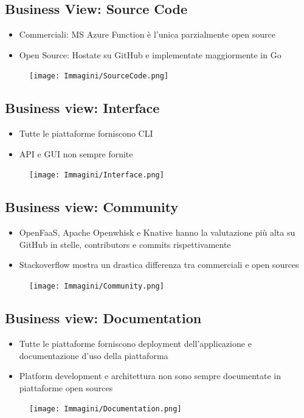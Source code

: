 \documentclass[a4paper, 12pt]{report}
\begin{document}
            \subsection{Business View: Source Code}
            \begin{itemize}
              \item Commerciali: MS Azure Function è l'unica parzialmente open source
              \item Open Source: Hostate su GitHub e implementate maggiormente in Go
            \end{itemize}
            \begin{figure}[h]
              \centering
              \texttt{[image: Immagini/SourceCode.png]}
            \end{figure}
            \subsection{Business view: Interface}
            \begin{itemize}
              \item Tutte le piattaforme forniscono CLI
              \item API e GUI non sempre fornite
            \end{itemize}
            \begin{figure}[h]
              \centering
              \texttt{[image: Immagini/Interface.png]}
            \end{figure}
            \clearpage
            \subsection{Business view: Community}
            \begin{itemize}
              \item OpenFaaS, Apache Openwhisk e Knative hanno la valutazione più alta su GitHub in stelle, contributors e commits rispettivamente
              \item Stackoverflow mostra un drastica differenza tra commerciali e open sources
            \end{itemize}
            \begin{figure}[h]
              \centering
              \texttt{[image: Immagini/Community.png]}
            \end{figure}
            \subsection{Business view: Documentation}
            \begin{itemize}
              \item Tutte le piattaforme forniscono deployment dell'applicazione e documentazione d'uso della piattaforma 
              \item Platform development e architettura non sono sempre documentate in piattaforme open sources
            \end{itemize}
            \begin{figure}[h]
              \centering
              \texttt{[image: Immagini/Documentation.png]}
            \end{figure}
            \clearpage
\end{document}
